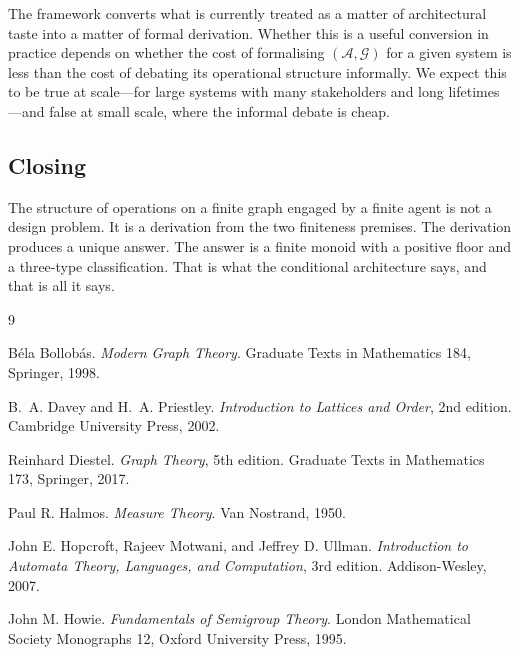 \documentclass[11pt,a4paper]{article}
\theoremstyle{thmstyle}
\theoremstyle{definition}
\theoremstyle{remark}
\newcommand{\Graph}{\mathcal{G}}
\newcommand{\Agent}{\mathcal{A}}
\begin{document}
The framework converts what is currently treated as a matter of
architectural taste into a matter of formal derivation. Whether
this is a useful conversion in practice depends on whether the cost
of formalising $(\Agent, \Graph)$ for a given system is less than
the cost of debating its operational structure informally. We
expect this to be true at scale---for large systems with many
stakeholders and long lifetimes---and false at small scale, where
the informal debate is cheap.

\subsection{Closing}

The structure of operations on a finite graph engaged by a finite
agent is not a design problem. It is a derivation from the two
finiteness premises. The derivation produces a unique answer. The
answer is a finite monoid with a positive floor and a three-type
classification. That is what the conditional architecture says, and
that is all it says.

\begin{thebibliography}{9}

 B\'ela Bollob\'as.
\emph{Modern Graph Theory}.
Graduate Texts in Mathematics 184, Springer, 1998.

B.~A. Davey and H.~A. Priestley.
\emph{Introduction to Lattices and Order}, 2nd edition.
Cambridge University Press, 2002.

 Reinhard Diestel.
\emph{Graph Theory}, 5th edition.
Graduate Texts in Mathematics 173, Springer, 2017.

 Paul R. Halmos.
\emph{Measure Theory}.
Van Nostrand, 1950.

John E. Hopcroft, Rajeev Motwani, and Jeffrey D. Ullman.
\emph{Introduction to Automata Theory, Languages, and Computation},
3rd edition. Addison-Wesley, 2007.

 John M. Howie.
\emph{Fundamentals of Semigroup Theory}.
London Mathematical Society Monographs 12, Oxford University Press,
1995.

\end{thebibliography}
\end{document}
